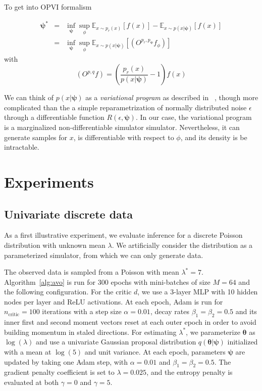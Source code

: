 \documentclass[twocolumn,superscriptaddress,aps]{revtex4-1}
\newcommand{\bftheta}{{\bm \theta}}
\newcommand{\bfpsi}{{\bm \psi}}
\theoremstyle{plain}
\begin{document}
To get into OPVI formalism

\begin{eqnarray}
\bfpsi^* &=& \inf_\bfpsi \sup_\phi\mathbb{E}_{x\sim p_r(x)}[f(x)] - \mathbb{E}_{x \sim p(x|\bfpsi)}[f(x)] \\
&=&  \inf_\bfpsi \sup_\phi \mathbb{E}_{ x \sim p( x | \bfpsi)} [ (O^{p_r,p_\bfpsi} f_\phi) ] 
\end{eqnarray}
with
\begin{equation}
(O^{p,q} f) = \left( \frac{p_r(x)}{p(x|\bfpsi)}  -1 \right) f(x)
\end{equation}

We can think of $p(x|\bfpsi)$ as a \textit{variational program} as described in ~\citep{2016arXiv161009033R}, though more complicated than the a simple reparametrization of normally distributed noise $\epsilon$ through a differentiable function $R(\epsilon, \bfpsi)$. In our case, the variational program is a marginalized non-differentiable simulator simulator.  Nevertheless, it can generate samples for $x$, is differentiable with respect to $\phi$, and its density is be intractable.




\section{Experiments}

\subsection{Univariate discrete data}

As a first illustrative experiment, we evaluate inference for a discrete Poisson
distribution with unknown mean $\lambda$. We artificially consider
the distribution as a parameterized simulator, from which we can only
generate data.

The observed data is sampled from a Poisson with mean $\lambda^* = 7$.
Algorithm~\ref{alg:avo} is run for 300 epochs with mini-batches of size $M=64$
and the following configuration. For the critic $d$, we use a 3-layer MLP with 10
hidden nodes per layer and ReLU activations. At each epoch, Adam is run for
$n_\text{critic}=100$ iterations with a step size $\alpha=0.01$, decay rates
$\beta_1=\beta_2=0.5$ and its inner first and second moment vectors reset at
each outer epoch in order to avoid building momentum in staled directions.  For
estimating $\lambda^*$, we parameterize $\bftheta$ as $\log(\lambda)$ and use a univariate Gaussian proposal distribution
$q(\bftheta|\bfpsi)$ initialized with a mean at $\log(5)$ and unit variance. At
each epoch, parameters $\bfpsi$ are updated by taking one Adam step, with
$\alpha=0.01$ and $\beta_1=\beta_2=0.5$. The gradient penalty coefficient is set to
$\lambda=0.025$, and the entropy penalty is evaluated at both $\gamma=0$ and $\gamma=5$.
\end{document}
